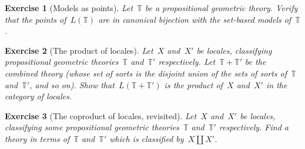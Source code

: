 \documentclass{ws-rv9x6}
\newtheorem{ex}{Exercise}
\newenvironment{exercise}[1]{
  \begin{ex}[#1]
}{\end{ex}}
\newcommand{\TT}{\mathbb{T}}
\renewcommand{\_}{\mathpunct{.}}
\newcommand{\?}{\,{:}\,}
\begin{document}
\begin{exercise}{Models as points}%
Let~$\TT$ be a propositional geometric theory. Verify that the points
of~$L(\TT)$ are in canonical bijection with the set-based models of~$\TT$.
\end{exercise}

\begin{exercise}{The product of locales}\label{ex:products-of-locales}%
Let~$X$ and~$X'$ be locales, classifying propositional geometric
theories~$\TT$ and~$\TT'$ respectively. Let~$\TT + \TT'$ be the combined theory
(whose set of sorts is the disjoint union of the sets of sorts of~$\TT$
and~$\TT'$, and so on). Show that~$L(\TT + \TT')$ is the product of~$X$
and~$X'$ in the category of locales.
\end{exercise}

\begin{exercise}{The coproduct of locales, revisited}%
Let~$X$ and~$X'$ be locales, classifying some propositional geometric
theories~$\TT$ and~$\TT'$ respectively. Find a theory in terms of~$\TT$
and~$\TT'$ which is classified by~$X \amalg X'$.
\end{exercise}
\end{document}
